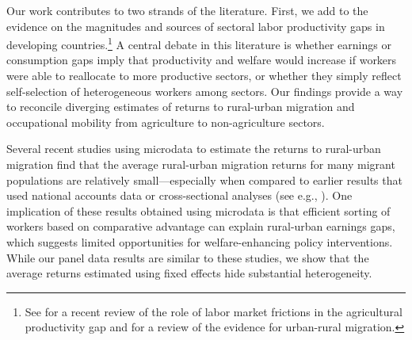 
Our work contributes to two strands of the literature. 
First, we add to the evidence on the magnitudes and sources of sectoral labor productivity gaps in developing countries.\footnote{See \cite{donovanRoleLaborMarket2023} for a recent review of the role of labor market frictions in the agricultural productivity gap and \cite{lagakosUrbanRuralGapsDeveloping2020a} for a review of the evidence for urban-rural migration.}
A central debate in this literature is whether earnings or consumption gaps imply that productivity and welfare would increase if workers were able to reallocate to more productive sectors, or whether they simply reflect self-selection of heterogeneous workers among sectors.
Our findings provide a way to reconcile diverging estimates of returns to rural-urban migration and occupational mobility from agriculture to non-agriculture sectors.

Several recent studies using microdata to estimate the returns to rural-urban migration \citep{alvarezAgriculturalWageGap2020, hamoryReevaluatingAgriculturalProductivity2021, herrendorfWagesHumanCapital2018} find that the average rural-urban migration returns for many migrant populations are relatively small---especially when compared to earlier results that used national accounts data or cross-sectional analyses (see e.g., \citealt{gollinAgriculturalProductivityGap2014,youngInequalityUrbanRuralGap2013}). 
One implication of these results obtained using microdata is that efficient sorting of workers based on comparative advantage can explain rural-urban earnings gaps, which suggests limited opportunities for welfare-enhancing policy interventions. 
While our panel data results are similar to these studies, we show that the average returns estimated using fixed effects hide substantial heterogeneity.

